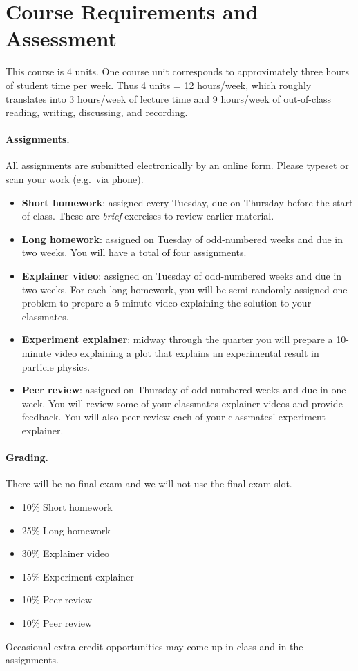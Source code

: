 \documentclass[12pt]{article}
\numberwithin{equation}{section}    %
\begin{document}
\section*{Course Requirements and Assessment}

This course is 4 units. One course unit corresponds to approximately three hours of student time per week. Thus 4 units = 12 hours/week, which roughly translates into 3 hours/week of lecture time and 9 hours/week of out-of-class reading, writing, discussing, and recording.  

\paragraph{Assignments.} All assignments are submitted electronically by an online form. Please typeset or scan your work (e.g.~via phone).
\begin{itemize}
	\item \textbf{Short homework}: assigned every Tuesday, due on Thursday before the start of class. These are \emph{brief} exercises to review earlier material.
	\item \textbf{Long homework}: assigned on Tuesday of odd-numbered weeks and due in two weeks. You will have a total of four assignments.
	\item \textbf{Explainer video}:  assigned on Tuesday of odd-numbered weeks and due in two weeks. For each long homework, you will be semi-randomly assigned one problem to prepare a 5-minute video explaining the solution to your classmates. 
	\item \textbf{Experiment explainer}: midway through the quarter you will prepare a 10-minute video explaining a plot that explains an experimental result in particle physics. 
	\item \textbf{Peer review}: assigned on Thursday of odd-numbered weeks and due in one week. You will review some of your classmates explainer videos and provide feedback. You will also peer review each of your classmates' experiment explainer.
\end{itemize}

\paragraph{Grading.} There will be no final exam and we will not use the final exam slot.
\begin{itemize}
\item 10\% Short homework
\item 25\% Long homework
\item 30\% Explainer video
\item 15\% Experiment explainer
\item 10\% Peer review
\item 10\% Peer review
\end{itemize}
Occasional extra credit opportunities may come up in class and in the assignments.
\end{document}
